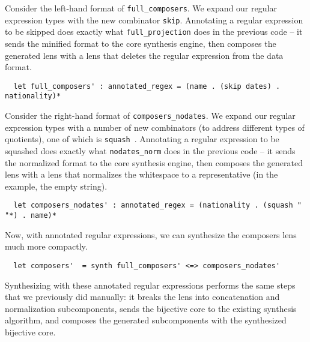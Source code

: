 \documentclass[a4paper]{article}
\begin{document}
Consider the left-hand format of \lstinline{full_composers}. We expand our
regular expression types with the new combinator \lstinline{skip}. Annotating a
regular expression to be skipped does exactly what \lstinline{full_projection}
does in the previous code -- it sends the minified format to the core synthesis
engine, then composes the generated lens with a lens that deletes the regular
expression from the data format.
%
\begin{lstlisting}
  let full_composers' : annotated_regex = (name . (skip dates) . nationality)*
\end{lstlisting}
%

Consider the right-hand format of \lstinline{composers_nodates}. We expand our
regular expression types with a number of new combinators (to address different
types of quotients), one of which is
\lstinline{squash}~\cite{maina+:quotient-synthesis}. Annotating a regular
expression to be squashed does exactly what \lstinline{nodates_norm} does in the
previous code -- it sends the normalized format to the core synthesis engine,
then composes the generated lens with a lens that normalizes the whitespace to a
representative (in the example, the empty string).
%
\begin{lstlisting}
  let composers_nodates' : annotated_regex = (nationality . (squash " "*) . name)*
\end{lstlisting}
%

Now, with annotated regular expressions, we can synthesize the composers lens much
more compactly.
%
\begin{lstlisting}
  let composers'  = synth full_composers' <=> composers_nodates'
\end{lstlisting}
%
Synthesizing with these annotated regular expressions performs the same steps
that we previously did manually: it breaks the lens into concatenation and
normalization subcomponents, sends the bijective core to the existing synthesis
algorithm, and composes the generated subcomponents with the synthesized
bijective core.

 

\end{document}
